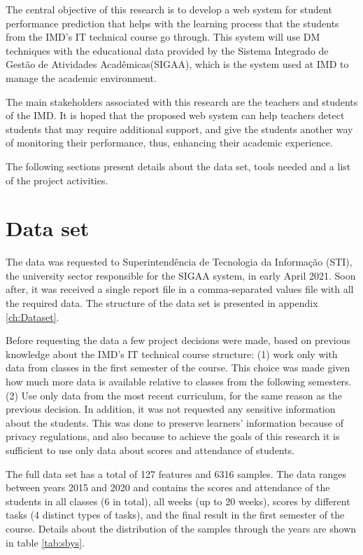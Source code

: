 The central objective of this research is to develop a web system for student performance prediction that helps with the learning process that the students from the IMD's IT technical course go through. This system will use DM techniques with the educational data provided by the Sistema Integrado de Gestão de Atividades Acadêmicas(SIGAA), which is the system used at IMD to manage the academic environment.

The main stakeholders associated with this research are the teachers and students of the IMD. It is hoped that the proposed web system can help teachers detect students that may require additional support, and give the students another way of monitoring their performance, thus, enhancing their academic experience.

The following sections present details about the data set, tools needed and a list of the project activities.

\section{Data set}

The data was requested to Superintendência de Tecnologia da Informação (STI), the university sector responsible for the SIGAA system, in early April 2021. Soon after, it was received a single report file in a comma-separated values file with all the required data. The structure of the data set is presented in appendix \ref{ch:Dataset}.

Before requesting the data a few project decisions were made, based on previous knowledge about the IMD's IT technical course structure: (1) work only with data from classes in the first semester of the course. This choice was made given how much more data is available relative to classes from the following semesters. (2) Use only data from the most recent curriculum, for the same reason as the previous decision. In addition, it was not requested any sensitive information about the students. This was done to preserve learners' information because of privacy regulations, and also because to achieve the goals of this research it is sufficient to use only data about scores and attendance of students.

The full data set has a total of 127 features and 6316 samples. The data ranges between years 2015 and 2020 and contains the scores and attendance of the students in all classes (6 in total), all weeks (up to 20 weeks), scores by different tasks (4 distinct types of tasks), and the final result in the first semester of the course. Details about the distribution of the samples through the years are shown in table \ref{tab:sbys}.

